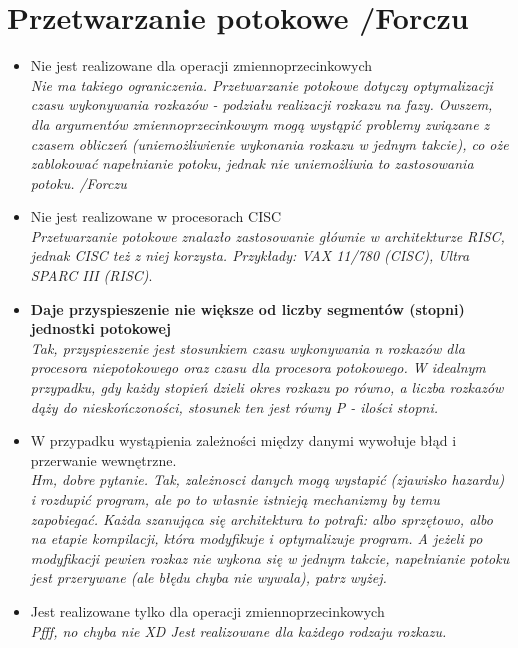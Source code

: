 \documentclass[a4paper,twoside]{article}
\begin{document}
\section{Przetwarzanie potokowe {\small /Forczu}}
	\begin{itemize}
    \item Nie jest realizowane dla operacji zmiennoprzecinkowych\\
    {\small \emph{Nie ma takiego ograniczenia. Przetwarzanie potokowe dotyczy optymalizacji czasu wykonywania rozkazów - podziału realizacji rozkazu na fazy. Owszem, dla argumentów zmiennoprzecinkowym mogą wystąpić problemy związane z czasem obliczeń (uniemożliwienie wykonania rozkazu w jednym takcie), co oże zablokować napełnianie potoku, jednak nie uniemożliwia to zastosowania potoku. /Forczu}}
    \item Nie jest realizowane w procesorach CISC\\
    {\small \emph{Przetwarzanie potokowe znalazło zastosowanie głównie w architekturze RISC, jednak CISC też z niej korzysta. Przykłady: VAX 11/780 (CISC), Ultra SPARC III (RISC)}.}
    \item \textbf{Daje przyspieszenie nie większe od liczby segmentów (stopni) jednostki potokowej}\\
    {\small \emph{Tak, przyspieszenie jest stosunkiem czasu wykonywania \emph{n} rozkazów dla procesora niepotokowego oraz czasu dla procesora potokowego. W idealnym przypadku, gdy każdy stopień dzieli okres rozkazu po równo, a liczba rozkazów dąży do nieskończoności, stosunek ten jest równy P - ilości stopni.}}
    \item W przypadku wystąpienia zależności między danymi wywołuje błąd i przerwanie wewnętrzne.\\
    {\small \emph{Hm, dobre pytanie. Tak, zależnosci danych mogą wystapić (zjawisko hazardu) i rozdupić program, ale po to własnie istnieją mechanizmy by temu zapobiegać. Każda szanująca się architektura to potrafi: albo sprzętowo, albo na etapie kompilacji, która modyfikuje i optymalizuje program. A jeżeli po modyfikacji pewien rozkaz nie wykona się w jednym takcie, napełnianie potoku jest przerywane (ale błędu chyba nie wywala), patrz wyżej.}}
    \item Jest realizowane tylko dla operacji zmiennoprzecinkowych\\
    {\small \emph{Pfff, no chyba nie XD Jest realizowane dla każdego rodzaju rozkazu.}}
    \end{itemize}

\end{document}
